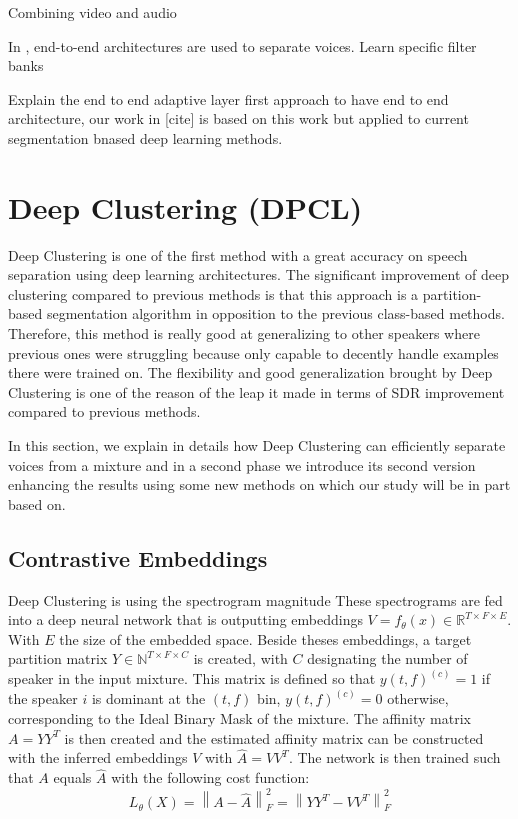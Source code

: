\documentclass[master,final,11pt]{iscs-thesis}
\newcommand{\norm}[1]{\left\lVert#1\right\rVert}
\begin{document}
Combining video and audio \cite{DAVSE, ImageSS, SpeechEnh}

In \cite{TAS, Adaptive}, end-to-end architectures are used to separate voices. Learn specific filter banks \cite{beyond, filterbanks}

Explain the end to end adaptive layer first approach to have end to end architecture, our work in [cite] is based on this work but applied to current segmentation bnased deep learning methods.

\section{Deep Clustering (DPCL)}

Deep Clustering \cite{DPCLV1,DPCLV2, DPCLEXT, chimera} is one of the first method with a great accuracy on speech separation using deep learning architectures. The significant improvement of deep clustering compared to previous methods is that this approach is a partition-based segmentation algorithm in opposition to the previous class-based methods. Therefore, this method is really good at generalizing to other speakers where previous ones were struggling because only capable to decently handle examples there were trained on. The flexibility and good generalization brought by Deep Clustering is one of the reason of the leap it made in terms of SDR improvement compared to previous methods.

In this section, we explain in details how Deep Clustering can efficiently separate voices from a mixture and in a second phase we introduce its second version enhancing the results using some new methods on which our study will be in part based on.

\subsection{Contrastive Embeddings}

Deep Clustering is using the spectrogram magnitude
These spectrograms are fed into a deep neural network that is outputting embeddings $V = f_\theta(x) \in \mathbb{R}^{T \times F \times E}$. With $E$ the size of the embedded space.
Beside theses embeddings, a target partition matrix $Y \in \mathbb{N}^{T \times F \times C}$ is created,  with $C$ designating the number of speaker in the input mixture. This matrix is defined so that $y(t,f)^{(c)} = 1$ if the speaker $i$ is dominant at the $(t,f)$ bin, $y(t,f)^{(c)} = 0$ otherwise, corresponding to the Ideal Binary Mask of the mixture. The affinity matrix $A = YY^{T}$ is then created and the estimated affinity matrix can be constructed with the inferred embeddings $V$ with $\hat{A}=VV^{T}$. The network is then trained such that $A$ equals $\hat{A}$ with the following cost function:
\[L_\theta(X) = \norm{ A - \hat{A}}^2_F =  \norm{ YY^{T} - VV^{T}}^2_F \]
 
\end{document}
